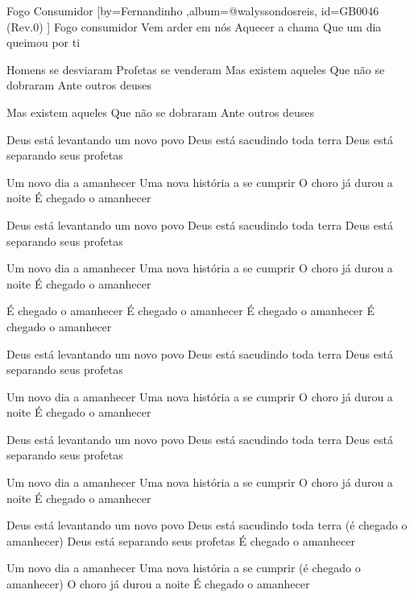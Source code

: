 \beginsong
{Fogo Consumidor %
}[by={Fernandinho %
},album={@walyssondosreis},
id={GB0046 %
(Rev.0) %
}]
Fogo consumidor
Vem arder em nós
Aquecer a chama
Que um dia queimou por ti

Homens se desviaram
Profetas se venderam
Mas existem aqueles
Que não se dobraram
Ante outros deuses

Mas existem aqueles
Que não se dobraram
Ante outros deuses

Deus está levantando um novo povo
Deus está sacudindo toda terra
Deus está separando seus profetas

Um novo dia a amanhecer
Uma nova história a se cumprir
O choro já durou a noite
É chegado o amanhecer

Deus está levantando um novo povo
Deus está sacudindo toda terra
Deus está separando seus profetas

Um novo dia a amanhecer
Uma nova história a se cumprir
O choro já durou a noite
É chegado o amanhecer

É chegado o amanhecer
É chegado o amanhecer
É chegado o amanhecer
É chegado o amanhecer

Deus está levantando um novo povo
Deus está sacudindo toda terra
Deus está separando seus profetas

Um novo dia a amanhecer
Uma nova história a se cumprir
O choro já durou a noite
É chegado o amanhecer

Deus está levantando um novo povo
Deus está sacudindo toda terra
Deus está separando seus profetas

Um novo dia a amanhecer
Uma nova história a se cumprir
O choro já durou a noite
É chegado o amanhecer

Deus está levantando um novo povo
Deus está sacudindo toda terra (é chegado o amanhecer)
Deus está separando seus profetas
É chegado o amanhecer

Um novo dia a amanhecer
Uma nova história a se cumprir (é chegado o amanhecer)
O choro já durou a noite
É chegado o amanhecer


